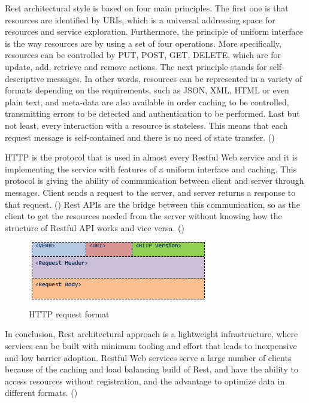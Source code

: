 Rest architectural style is based on four main principles. The first one is that resources are identified by URIs, which is a universal addressing space for resources and service exploration. Furthermore, the principle of uniform interface is the way resources are by using a set of four operations. More specifically, resources can be controlled by PUT, POST, GET, DELETE, which are for update, add, retrieve and remove actions. The next principle stands for self-descriptive messages. In other words, resources can be represented in a variety of formats depending on the requirements, such as JSON, XML, HTML or even plain text, and meta-data are also available in order caching to be controlled, transmitting errors to be detected and authentication to be performed. Last but not least, every interaction with a resource is stateless. This means that each request message is self-contained and there is no need of state transfer. (\cite{Reference8}) \par

HTTP is the protocol that is used in almost every Restful Web service and it is implementing the service with features of a uniform interface and caching. This protocol is giving the ability of communication between client and server through messages. Client sends a request to the server, and server returns a response to that request. (\cite{Reference7}) Rest APIs are the bridge between this communication, so as the client to get the resources needed from the server without knowing how the structure of Restful API works and vice versa. (\cite{Reference9}) \par

\begin{figure}[h!]
	\begin{center}
		\includegraphics[scale=0.85]{images/httpFormat.png}
	\end{center}
	\caption{HTTP request format}
\end{figure}

In conclusion, Rest architectural approach is a lightweight infrastructure, where services can be built with minimum tooling and effort that leads to inexpensive and low barrier adoption. Restful Web services serve a large number of clients because of the caching and load balancing build of Rest, and have the ability to access resources without registration, and the advantage to optimize data in different formats. (\cite{Reference8}) \par

